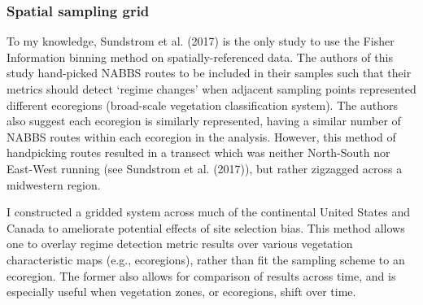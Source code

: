 \documentclass[12pt,twoside,openany]{reedthesis}
\begin{document}
\subsubsection{Spatial sampling grid}\label{spatial-sampling-grid}

To my knowledge, Sundstrom et al. (2017) is the only study to use the
Fisher Information binning method on spatially-referenced data. The
authors of this study hand-picked NABBS routes to be included in their
samples such that their metrics should detect `regime changes' when
adjacent sampling points represented different ecoregions (broad-scale
vegetation classification system). The authors also suggest each
ecoregion is similarly represented, having a similar number of NABBS
routes within each ecoregion in the analysis. However, this method of
handpicking routes resulted in a transect which was neither North-South
nor East-West running (see Sundstrom et al. (2017)), but rather
zigzagged across a midwestern region.

I constructed a gridded system across much of the continental United
States and Canada to ameliorate potential effects of site selection
bias. This method allows one to overlay regime detection metric results
over various vegetation characteristic maps (e.g., ecoregions), rather
than fit the sampling scheme to an ecoregion. The former also allows for
comparison of results across time, and is especially useful when
vegetation zones, or ecoregions, shift over time.
\end{document}
